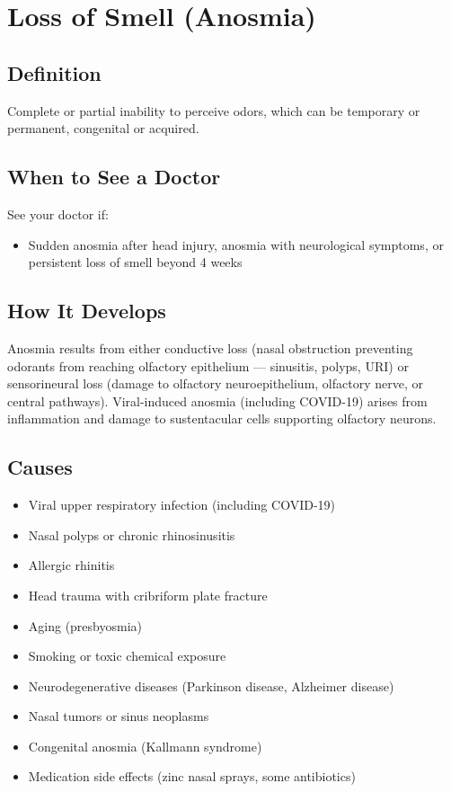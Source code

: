 \chapter{Loss of Smell (Anosmia)}

\section*{Definition}
Complete or partial inability to perceive odors, which can be temporary or permanent, congenital or acquired.

\section*{When to See a Doctor}
See your doctor if:
\begin{itemize}
  \item Sudden anosmia after head injury, anosmia with neurological symptoms, or persistent loss of smell beyond 4 weeks
\end{itemize}

\section*{How It Develops}
Anosmia results from either conductive loss (nasal obstruction preventing odorants from reaching olfactory epithelium — sinusitis, polyps, URI) or sensorineural loss (damage to olfactory neuroepithelium, olfactory nerve, or central pathways). Viral-induced anosmia (including COVID-19) arises from inflammation and damage to sustentacular cells supporting olfactory neurons.

\section*{Causes}
\begin{itemize}
  \item Viral upper respiratory infection (including COVID-19)
  \item Nasal polyps or chronic rhinosinusitis
  \item Allergic rhinitis
  \item Head trauma with cribriform plate fracture
  \item Aging (presbyosmia)
  \item Smoking or toxic chemical exposure
  \item Neurodegenerative diseases (Parkinson disease, Alzheimer disease)
  \item Nasal tumors or sinus neoplasms
  \item Congenital anosmia (Kallmann syndrome)
  \item Medication side effects (zinc nasal sprays, some antibiotics)
\end{itemize}

